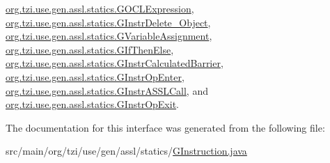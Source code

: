 \hyperlink{classorg_1_1tzi_1_1use_1_1gen_1_1assl_1_1statics_1_1_g_o_c_l_expression_ab8cfdf2187d9a870d3181691d65f5173}{org.\-tzi.\-use.\-gen.\-assl.\-statics.\-G\-O\-C\-L\-Expression}, \hyperlink{classorg_1_1tzi_1_1use_1_1gen_1_1assl_1_1statics_1_1_g_instr_delete___object_a3da68fa56c9e3123408882113ad852d6}{org.\-tzi.\-use.\-gen.\-assl.\-statics.\-G\-Instr\-Delete\-\_\-\-Object}, \hyperlink{classorg_1_1tzi_1_1use_1_1gen_1_1assl_1_1statics_1_1_g_variable_assignment_a66b4fd4567b7dec459705400ef5b39dd}{org.\-tzi.\-use.\-gen.\-assl.\-statics.\-G\-Variable\-Assignment}, \hyperlink{classorg_1_1tzi_1_1use_1_1gen_1_1assl_1_1statics_1_1_g_if_then_else_a4fd1338f0705aa9c486968454f0ea0bc}{org.\-tzi.\-use.\-gen.\-assl.\-statics.\-G\-If\-Then\-Else}, \hyperlink{classorg_1_1tzi_1_1use_1_1gen_1_1assl_1_1statics_1_1_g_instr_calculated_barrier_a9c9e829a9751ce3374a8a757c616d32b}{org.\-tzi.\-use.\-gen.\-assl.\-statics.\-G\-Instr\-Calculated\-Barrier}, \hyperlink{classorg_1_1tzi_1_1use_1_1gen_1_1assl_1_1statics_1_1_g_instr_op_enter_ab00f21a55260e7ae8d56c59570663aee}{org.\-tzi.\-use.\-gen.\-assl.\-statics.\-G\-Instr\-Op\-Enter}, \hyperlink{classorg_1_1tzi_1_1use_1_1gen_1_1assl_1_1statics_1_1_g_instr_a_s_s_l_call_ac2228a87ddb849ed8d7edcf6476dac43}{org.\-tzi.\-use.\-gen.\-assl.\-statics.\-G\-Instr\-A\-S\-S\-L\-Call}, and \hyperlink{classorg_1_1tzi_1_1use_1_1gen_1_1assl_1_1statics_1_1_g_instr_op_exit_a52aad89a6953724480c770d8b5c4c26f}{org.\-tzi.\-use.\-gen.\-assl.\-statics.\-G\-Instr\-Op\-Exit}.



The documentation for this interface was generated from the following file\-:\begin{DoxyCompactItemize}
\item 
src/main/org/tzi/use/gen/assl/statics/\hyperlink{_g_instruction_8java}{G\-Instruction.\-java}\end{DoxyCompactItemize}
